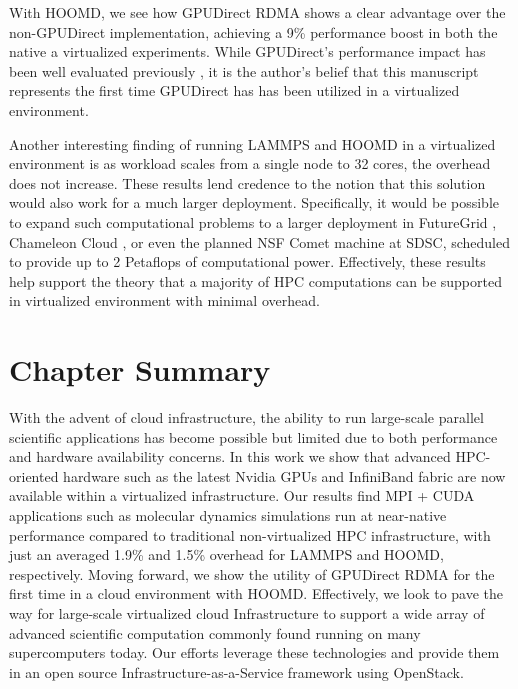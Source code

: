 With HOOMD, we see how GPUDirect RDMA shows a clear advantage over the
non-GPUDirect implementation, achieving a 9\% performance boost in both the
native a virtualized experiments.  While GPUDirect's performance impact has been well evaluated previously \cite{GPUDirect}, it is the author's belief that this manuscript represents the first time GPUDirect has has been utilized in a virtualized environment.  

Another interesting finding of running LAMMPS and HOOMD in a virtualized environment is as workload scales from a single node to 32 cores, the overhead does not increase. These results lend credence to the notion that this solution would also work for a much larger deployment. Specifically, it would be possible to expand such computational problems to a larger deployment in FutureGrid \cite{fox2013futuregrid}, Chameleon Cloud \cite{www-chameleon}, or even the planned NSF Comet machine at SDSC, scheduled to provide up to 2 Petaflops of computational power. Effectively, these results help support the theory that a majority of HPC computations can be supported in virtualized environment with minimal overhead. 


\section{Chapter Summary}

With the advent of cloud infrastructure, the ability to run large-scale parallel scientific applications has become possible but limited due to both performance and hardware availability concerns. In this work we show that advanced HPC-oriented hardware such as the latest Nvidia GPUs and InfiniBand fabric are now available within a virtualized infrastructure. Our results find MPI + CUDA applications such as molecular dynamics simulations run at near-native performance compared to traditional non-virtualized HPC infrastructure, with just an averaged 1.9\% and 1.5\% overhead for LAMMPS and HOOMD, respectively. Moving forward, we show the utility of GPUDirect RDMA for the first time in a cloud environment with HOOMD.  Effectively, we look to pave the way for large-scale virtualized cloud Infrastructure to support a wide array of advanced scientific computation commonly found running on many supercomputers today.  Our efforts leverage these technologies and provide them in an open source Infrastructure-as-a-Service framework using OpenStack.  




 

